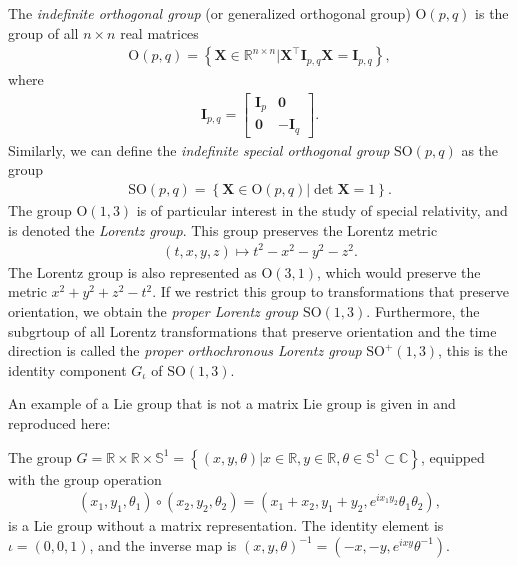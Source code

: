 \begin{example}
    The \emph{indefinite orthogonal group} (or generalized orthogonal group) $\text{O}(p,q)$ is the group of all $n\times n$ real matrices
    \begin{align}
        \text{O}(p,q) = \left\{\mathbf{X}\in\mathbb{R}^{n\times n} | \mathbf{X}^\top\mathbf{I}_{p,q}\mathbf{X} = \mathbf{I}_{p,q}\right\},
    \end{align}
    where
    \begin{align}
        \mathbf{I}_{p,q} = \begin{bmatrix}
            \mathbf{I}_p & \mathbf{0}\\
            \mathbf{0} & -\mathbf{I}_q
        \end{bmatrix}.
    \end{align}
    Similarly, we can define the \emph{indefinite special orthogonal group} $\text{SO}(p,q)$ as the group
    \begin{align}
        \text{SO}(p, q) = \left\{\mathbf{X}\in\text{O}(p, q) | \det\mathbf{X}=1\right\}.
    \end{align}
    The group $\text{O}(1,3)$ is of particular interest in the study of special relativity, and is denoted the \emph{Lorentz group}. This group preserves the Lorentz metric
    \begin{align}
        (t,x,y,z) \mapsto t^2 - x^2 - y^2 - z^2.
    \end{align}
    The Lorentz group is also represented as $\text{O}(3,1)$, which would preserve the metric $x^2 + y^2 + z^2 - t^2$.
    If we restrict this group to transformations that preserve orientation, we obtain the \emph{proper Lorentz group} $\text{SO}(1,3)$. Furthermore, the subgrtoup of all Lorentz transformations that preserve orientation and the time direction is called the  \emph{proper orthochronous Lorentz group} $\text{SO}^+(1,3)$, this is the identity component $G_\iota$ of $\text{SO}(1,3)$.
    
\end{example}
\begin{example}\label{ex:non-matrix-lie-group}
    An example of a Lie group that is not a matrix Lie group is given in \citet[p. 25]{Hall2015} and reproduced here:

    The group $G = \mathbb{R} \times \mathbb{R} \times \mathbb{S}^1 = \left\{(x, y, \theta) | x \in \mathbb{R}, y \in \mathbb{R}, \theta \in \mathbb{S}^1\subset\mathbb{C}\right\}$, equipped with the group operation
    \begin{align}
        (x_1, y_1, \theta_1)\circ (x_2, y_2, \theta_2) = (x_1 + x_2, y_1 + y_2, e^{ix_1y_2}\theta_1\theta_2),
    \end{align}
    is a Lie group without a matrix representation. The identity element is $\iota=(0, 0, 1)$, and the inverse map is $(x, y, \theta)^{-1} = (-x, -y, e^{ixy}\theta^{-1})$.
\end{example} 

